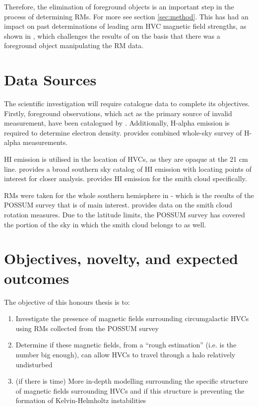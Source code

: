 Therefore, the elimination of foreground objects is an important step in the process of determining RMs. For more see section \ref{sec:method}. This has had an impact on past determinations of leading arm HVC magnetic field strengths, as shown in \citep{ID36}, which challenges the results of \citep{ID2} on the basis that there was a foreground object manipulating the RM data.

\section{Data Sources}
\label{sec:sources}

The scientific investigation will require catalogue data to complete its objectives. Firstly, foreground observations, which act as the primary source of invalid measurement, have been catalogued by \citep{ID44, ID45}. Additionally, H-alpha emission is required to determine electron density. \citep{ID43} provides combined whole-sky survey of H-alpha measurements.

HI emission is utilised in the location of HVCs, as they are opaque at the 21 cm line. \citep{ID3, ID6} provides a broad southern sky catalog of HI emission with \citep{ID3} locating points of interest for closer analysis. \citep{ID28} provides HI emission for the smith cloud specifically.

RMs were taken for the whole southern hemisphere in \citep{ID1} - which is the results of the POSSUM survey that is of main interest. \citep{ID18} provides data on the smith cloud rotation measures. Due to the latitude limits, the POSSUM survey has covered the portion of the sky in which the smith cloud belongs to as well.

\section{Objectives, novelty, and expected outcomes}
\label{sec:objectives}

The objective of this honours thesis is to:
\begin{enumerate}
\item Investigate the presence of magnetic fields surrounding circumgalactic HVCs using RMs collected from the POSSUM survey
\item Determine if these magnetic fields, from a “rough estimation” (i.e. is the number big enough), can allow HVCs to travel through a halo relatively undisturbed
\item (if there is time) More in-depth modelling surrounding the specific structure of magnetic fields surrounding HVCs and if this structure is preventing the formation of Kelvin-Helmholtz instabilities
\end{enumerate}

